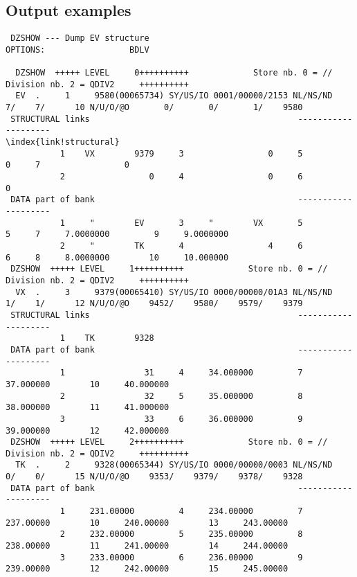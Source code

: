 \subsection{Output examples}
\begin{Listing}\begin{verbatim}
 DZSHOW --- Dump EV structure                                                                      OPTIONS:                 BDLV
 
  DZSHOW  +++++ LEVEL     0++++++++++             Store nb. 0 = //       Division nb. 2 = QDIV2     ++++++++++
  EV  .     1     9580(00065734) SY/US/IO 0001/00000/2153 NL/NS/ND    7/    7/      10 N/U/O/@O       0/       0/       1/    9580
 STRUCTURAL links                                          --------------------
\index{link!structural}
           1    VX        9379     3                 0     5                 0     7                 0
           2                 0     4                 0     6                 0
 DATA part of bank                                         --------------------
           1     "        EV       3     "        VX       5                 5     7     7.0000000         9     9.0000000
           2     "        TK       4                 4     6                 6     8     8.0000000        10     10.000000
 DZSHOW  +++++ LEVEL     1++++++++++             Store nb. 0 = //       Division nb. 2 = QDIV2     ++++++++++
  VX  .     3     9379(00065410) SY/US/IO 0000/00000/01A3 NL/NS/ND    1/    1/      12 N/U/O/@O    9452/    9580/    9579/    9379
 STRUCTURAL links                                          --------------------
           1    TK        9328
 DATA part of bank                                         --------------------
           1                31     4     34.000000         7     37.000000        10     40.000000
           2                32     5     35.000000         8     38.000000        11     41.000000
           3                33     6     36.000000         9     39.000000        12     42.000000
 DZSHOW  +++++ LEVEL     2++++++++++             Store nb. 0 = //       Division nb. 2 = QDIV2     ++++++++++
  TK  .     2     9328(00065344) SY/US/IO 0000/00000/0003 NL/NS/ND    0/    0/      15 N/U/O/@O    9353/    9379/    9378/    9328
 DATA part of bank                                         --------------------
           1     231.00000         4     234.00000         7     237.00000        10     240.00000        13     243.00000
           2     232.00000         5     235.00000         8     238.00000        11     241.00000        14     244.00000
           3     233.00000         6     236.00000         9     239.00000        12     242.00000        15     245.00000
\end{verbatim}\end{Listing}
